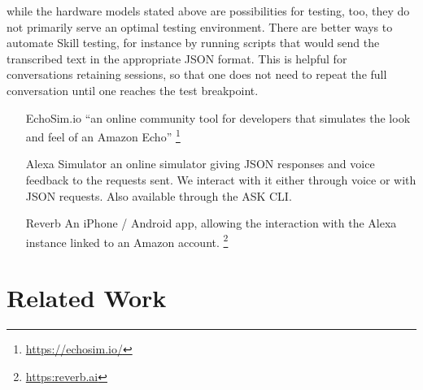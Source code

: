 while the hardware models stated above are possibilities for testing, too, they do not primarily serve an optimal testing environment. There are better ways to automate Skill testing, for instance by running scripts that would send the transcribed text in the appropriate JSON format. This is helpful for conversations retaining sessions, so that one does not need to repeat the full conversation until one reaches the test breakpoint.

\begin{itemize}
	\item[EchoSim.io] ``an online community tool for developers that simulates the look and feel of an Amazon Echo'' \footnote{\url{https://echosim.io/}}
	\item[Alexa Simulator] an online simulator giving JSON responses and voice feedback to the requests sent. We interact with it either through voice or with JSON requests. Also available through the ASK CLI.
	\item[Reverb] An iPhone / Android app, allowing the interaction with the Alexa instance linked to an Amazon account. \footnote{\url{https:reverb.ai}} 
\end{itemize}











\section{Related Work}

